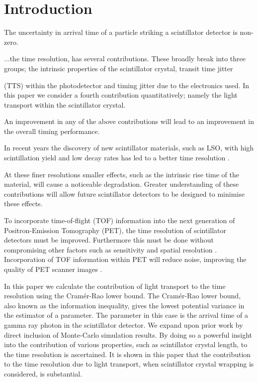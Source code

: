 \section*{Introduction}
The uncertainty in arrival time of a particle striking a scintillator detector is non-zero. 


...the time resolution, has several contributions. These broadly break into three groups; the intrinsic properties of the scintillator crystal, transit time jitter %

(TTS) within the photodetector and timing jitter due to the electronics used. In this paper we consider a fourth contribution quantitatively; namely the light transport within the scintillator crystal. 

An improvement in any of the above contributions will lead to an improvement in the overall timing performance.

In recent years the discovery of new scintillator materials, such as LSO, with high scintillation yield and low decay rates has led to a better time resolution \cite{Dorenbos2010a,Conti2009a}. 

At these finer resolutions smaller effects, such as the intrinsic rise time of the material, will cause a noticeable degradation. Greater understanding of these contributions will allow future scintillator detectors to be designed to minimise these effects. 

To incorporate time-of-flight (TOF) information into the next generation of Positron-Emission Tomography (PET), the time resolution of scintillator detectors must be improved. Furthermore this must be done without compromising other factors such as sensitivity and spatial resolution \cite{Eriksson2004}. Incorporation of TOF information within PET will reduce noise, improving the quality of PET scanner images \cite{Geramifar2011}.

In this paper we calculate the contribution of light transport to the time resolution using the Cram\'{e}r-Rao lower bound. The Cram\'{e}r-Rao lower bound, also known as the information inequality, gives the lowest potential variance in the estimator of a parameter. The parameter in this case is the arrival time of a
gamma ray photon in the scintillator detector. We expand upon prior work \cite{Seifert2012} by direct inclusion of Monte-Carlo simulation results. By doing so a powerful insight into the contribution of various properties, such as scintillator crystal length, to the time resolution is ascertained. It is shown in this paper that the contribution to the time resolution due to light transport, when scintillator crystal wrapping is considered, is substantial.